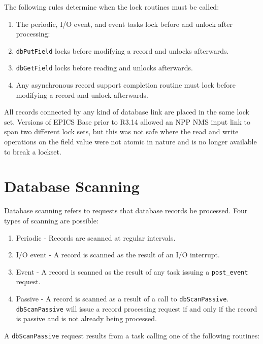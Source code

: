 The following rules determine when the lock routines must be called:

\begin{enumerate}\item The periodic, I/O event, and event tasks lock before and unlock after processing:

\item \verb|dbPutField| locks before modifying a record and unlocks afterwards.

\item \verb|dbGetField| locks before reading and unlocks afterwards.

\item Any asynchronous record support completion routine must lock before modifying a record and unlock afterwards.

\end{enumerate}
All records connected by any kind of database link are placed in the same lock set. Versions of EPICS Base prior to R3.14 
allowed an NPP NMS input link to span two different lock sets, but this was not safe where the read and write operations 
on the field value were not atomic in nature and is no longer available to break a lockset.

\section{Database Scanning}

Database scanning refers to requests that database records be processed. Four types of scanning are possible:

\begin{enumerate}\item {}Periodic - Records are scanned at regular intervals.

\item {}I/O event - A record is scanned as the result of an I/O interrupt.

\item {}Event - A record is scanned as the result of any task issuing a \verb|post_event| request.

\item {}Passive - A record is scanned as a result of a call to \verb|dbScanPassive|. \verb|dbScanPassive| will issue a record 
processing request if and only if the record is passive and is not already being processed.

\end{enumerate}A \verb|dbScanPassive| request results from a task calling one of the following routines:

